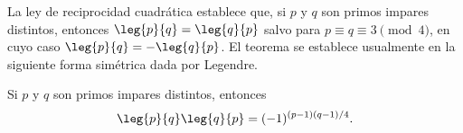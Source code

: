 \documentclass[12pt,a4paper]{book}
\begin{document}
    La ley de reciprocidad cuadrática establece que, si $p$ y $q$ son primos impares
    distintos, entonces $\leg{p}{q}=\leg{q}{p}$ salvo para $p\equiv q\equiv3\pmod{4}$, en
    cuyo caso $\leg{p}{q}=-\leg{q}{p}$. El teorema se establece usualmente en la siguiente
    forma simétrica dada por Legendre.

    \begin{teorema}\label{teo:9-8}
        Si $p$ y $q$ son primos impares distintos, entonces
        \begin{equation}\label{eq:9-4}
            \leg{p}{q}\leg{q}{p}=(-1)^{(p-1)(q-1)/4}.
        \end{equation}
    \end{teorema}
\end{document}
